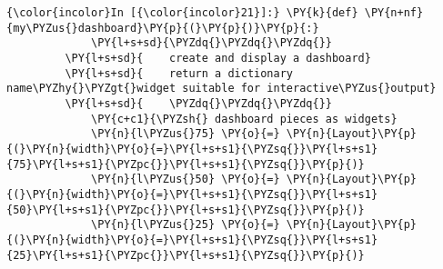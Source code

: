     \begin{Verbatim}[commandchars=\\\{\}]
{\color{incolor}In [{\color{incolor}21}]:} \PY{k}{def} \PY{n+nf}{my\PYZus{}dashboard}\PY{p}{(}\PY{p}{)}\PY{p}{:}
             \PY{l+s+sd}{\PYZdq{}\PYZdq{}\PYZdq{}}
         \PY{l+s+sd}{    create and display a dashboard}
         \PY{l+s+sd}{    return a dictionary name\PYZhy{}\PYZgt{}widget suitable for interactive\PYZus{}output}
         \PY{l+s+sd}{    \PYZdq{}\PYZdq{}\PYZdq{}}
             \PY{c+c1}{\PYZsh{} dashboard pieces as widgets}
             \PY{n}{l\PYZus{}75} \PY{o}{=} \PY{n}{Layout}\PY{p}{(}\PY{n}{width}\PY{o}{=}\PY{l+s+s1}{\PYZsq{}}\PY{l+s+s1}{75}\PY{l+s+s1}{\PYZpc{}}\PY{l+s+s1}{\PYZsq{}}\PY{p}{)}
             \PY{n}{l\PYZus{}50} \PY{o}{=} \PY{n}{Layout}\PY{p}{(}\PY{n}{width}\PY{o}{=}\PY{l+s+s1}{\PYZsq{}}\PY{l+s+s1}{50}\PY{l+s+s1}{\PYZpc{}}\PY{l+s+s1}{\PYZsq{}}\PY{p}{)}
             \PY{n}{l\PYZus{}25} \PY{o}{=} \PY{n}{Layout}\PY{p}{(}\PY{n}{width}\PY{o}{=}\PY{l+s+s1}{\PYZsq{}}\PY{l+s+s1}{25}\PY{l+s+s1}{\PYZpc{}}\PY{l+s+s1}{\PYZsq{}}\PY{p}{)}
         

\end{Verbatim}
